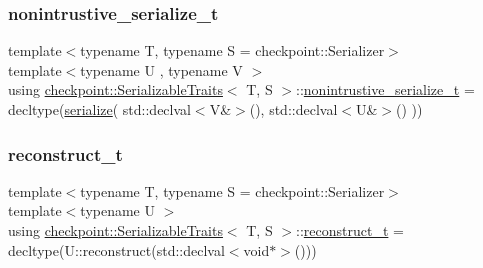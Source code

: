 \mbox{\label{structcheckpoint_1_1_serializable_traits_a3284d2cfd29cfe429d5cf76186d3fe3c}} 
\subsubsection{\texorpdfstring{nonintrustive\+\_\+serialize\+\_\+t}{nonintrustive\_serialize\_t}}
{\footnotesize\ttfamily template$<$typename T, typename S = checkpoint\+::\+Serializer$>$ \\
template$<$typename U , typename V $>$ \\
using \hyperlink{structcheckpoint_1_1_serializable_traits}{checkpoint\+::\+Serializable\+Traits}$<$ T, S $>$\+::\hyperlink{structcheckpoint_1_1_serializable_traits_a3284d2cfd29cfe429d5cf76186d3fe3c}{nonintrustive\+\_\+serialize\+\_\+t} =  decltype(\hyperlink{namespacecheckpoint_a075da4e7344cf037943362517e606c3a}{serialize}( std\+::declval$<$V\&$>$(), std\+::declval$<$U\&$>$() ))}

\mbox{\label{structcheckpoint_1_1_serializable_traits_a9f161977ecf1aed8a4ccd5d63768399a}} 
\subsubsection{\texorpdfstring{reconstruct\+\_\+t}{reconstruct\_t}}
{\footnotesize\ttfamily template$<$typename T, typename S = checkpoint\+::\+Serializer$>$ \\
template$<$typename U $>$ \\
using \hyperlink{structcheckpoint_1_1_serializable_traits}{checkpoint\+::\+Serializable\+Traits}$<$ T, S $>$\+::\hyperlink{structcheckpoint_1_1_serializable_traits_a9f161977ecf1aed8a4ccd5d63768399a}{reconstruct\+\_\+t} =  decltype(U\+::reconstruct(std\+::declval$<$void$\ast$$>$()))}

\mbox{\label{structcheckpoint_1_1_serializable_traits_a416ff19cd1038279ace5cb49e3a9fb7d}} 
